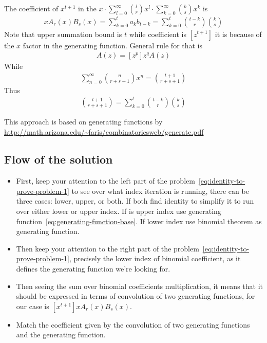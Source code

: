 The coefficient of $x^{t+1}$ in the $x \cdot \sum_{l=0}^{\infty} \binom{l}{r} x^l \cdot \sum_{k=0}^{\infty} \binom{k}{s} x^k$ is
\begin{align*}
[x^{t+1}]
    x A_r(x) B_s(x) = \sum_{k=0}^{t} a_k b_{t-k} = \sum_{k=0}^{t} \binom{t-k}{r} \binom{k}{s}
\end{align*}
Note that upper summation bound is $t$ while coefficient is $[z^{t+1}]$ it is because of the $x$ factor in the generating function.
General rule for that is
\begin{align*}
[z^{p-q}]
    A(z)=[z^p]z^qA(z)
\end{align*}
While
\begin{align*}
[x^{t+1}]
    \sum_{n=0}^{\infty} \binom{n}{r+s+1} x^n = \binom{t+1}{r+s+1}
\end{align*}
Thus
\begin{align*}
    \binom{t+1}{r+s+1} = \sum_{k=0}^{t} \binom{t-k}{r} \binom{k}{s}
\end{align*}

This approach is based on generating functions
by \url{http://math.arizona.edu/~faris/combinatoricsweb/generate.pdf}

\subsection{Flow of the solution}
\label{subsec:flow-of-the-solution}
\begin{itemize}
    \item First, keep your attention to the left part of the problem~\eqref{eq:identity-to-prove-problem-1}
    to see over what index iteration is running, there can be three cases: lower, upper, or both.
    If both find identity to simplify it to run over either lower or upper index.
    If is upper index use generating function~\eqref{eq:generating-function-base}.
    If lower index use binomial theorem as generating function.
    \item Then keep your attention to the right part of the problem~\eqref{eq:identity-to-prove-problem-1},
    precisely the lower index of binomial coefficient, as it defines the generating function
    we're looking for.
    \item Then seeing the sum over binomial coefficients multiplication,
    it means that it should be expressed in terms of convolution of two generating functions,
    for our case is $[x^{t+1}] x A_r(x) B_s(x)$.
    \item Match the coefficient given by the convolution of two generating functions and the generating function.
\end{itemize}


\clearpage
